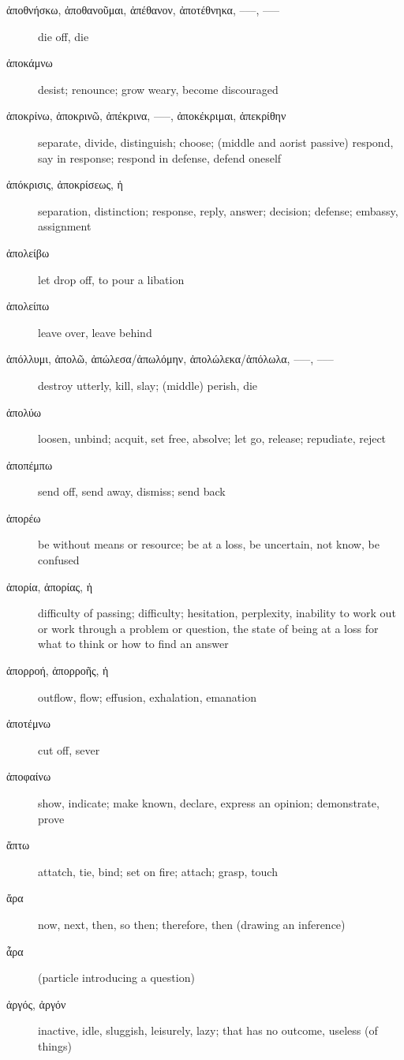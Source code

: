 \documentclass[12pt,letterpaper]{article}
\begin{document}
\begin{description}
    \item[\textgreek{ἀποθνήσκω, ἀποθανοῦμαι, ἀπέθανον, ἀποτέθνηκα, –––, –––}] \marginnote{*}die off, die
    \item[\textgreek{ἀποκάμνω}] desist; renounce; grow weary, become discouraged
    \item[\textgreek{ἀποκρίνω, ἀποκρινῶ, ἀπέκρινα, –––, ἀποκέκριμαι, ἀπεκρίθην}] \marginnote{*}separate, divide, distinguish; choose; (middle and aorist passive) respond, say in response; respond in defense, defend oneself
    \item[\textgreek{ἀπόκρισις, ἀποκρίσεως, ἡ}] separation, distinction; response, reply, answer; decision; defense; embassy, assignment
    \item[\textgreek{ἀπολείβω}] let drop off, to pour a libation
    \item[\textgreek{ἀπολείπω}] leave over, leave behind
    \item[\textgreek{ἀπόλλυμι, ἀπολῶ, ἀπώλεσα/ἀπωλόμην, ἀπολώλεκα/ἀπόλωλα, –––, –––}] \marginnote{*}destroy utterly, kill, slay; (middle) perish, die
    \item[\textgreek{ἀπολύω}] loosen, unbind; acquit, set free, absolve; let go, release; repudiate, reject
    \item[\textgreek{ἀποπέμπω}] send off, send away, dismiss; send back
    \item[\textgreek{ἀπορέω}] be without means or resource; be at a loss, be uncertain, not know, be confused
    \item[\textgreek{ἀπορία, ἀπορίας, ἡ}] difficulty of passing; difficulty; hesitation, perplexity, inability to work out or work through a problem or question, the state of being at a loss for what to think or how to find an answer
    \item[\textgreek{ἀπορροή, ἀπορροῆς, ἡ}] outflow, flow; effusion, exhalation, emanation
    \item[\textgreek{ἀποτέμνω}] cut off, sever
    \item[\textgreek{ἀποφαίνω}] show, indicate; make known, declare, express an opinion; demonstrate, prove
    \item[\textgreek{ἅπτω}] attatch, tie, bind; set on fire; attach; grasp, touch
    \item[\textgreek{ἄρα}] \marginnote{*}now, next, then, so then; therefore, then (drawing an inference)
    \item[\textgreek{ἆρα}] \marginnote{*}(particle introducing a question)
    \item[\textgreek{ἀργός, ἀργόν}] inactive, idle, sluggish, leisurely, lazy; that has no outcome, useless (of things)

\end{description}
\end{document}

